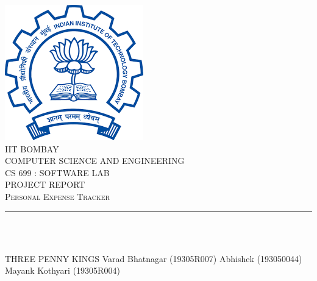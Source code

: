 \documentclass[12pt]{article}
\makeatletter
\let\thetitle\@title
\makeatother
\begin{document}

\begin{titlepage}
	\centering
    \vspace*{0.5 cm}
    \includegraphics[scale = 0.35]{logo.png}\\[1.0 cm]	%
    \textsc{\LARGE IIT BOMBAY}\\[2.0 cm]
    \textsc{\lARGE COMPUTER SCIENCE AND ENGINEERING}\\[0.2 cm]
    \textsc{\lARGE CS 699 : SOFTWARE LAB }\\[0.2 cm]
	\textsc{\Large PROJECT REPORT}\\[0.5 cm]				%
	\textsc{\large Personal Expense Tracker }\\[0.2 cm]
	\rule{\linewidth}{0.2 mm} \\[0.4 cm]
	{ \huge \bfseries \thetitle}\\
	
	
	\begin{minipage}{0.4\textwidth}
		
			\begin{flushright} 
			THREE PENNY KINGS
			\linebreak
			Varad Bhatnagar (19305R007)
			Abhishek (193050044)\\
			Mayank Kothyari (19305R004)
			\linebreak
		\end{flushright}
	\end{minipage}\\[2 cm]
	

 
	\vfill
	
\end{titlepage}

\end{document}
